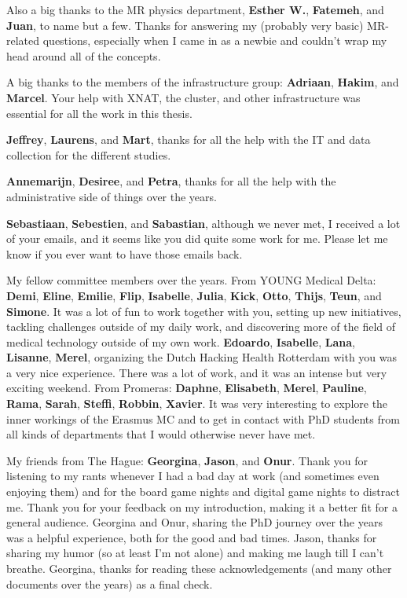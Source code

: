 Also a big thanks to the MR physics department, \textbf{Esther W.}, \textbf{Fatemeh}, and \textbf{Juan}, to name but a few.
Thanks for answering my (probably very basic) MR-related questions, especially when I came in as a newbie and couldn't wrap my head around all of the concepts.

A big thanks to the members of the infrastructure group: \textbf{Adriaan}, \textbf{Hakim}, and \textbf{Marcel}.
Your help with XNAT, the cluster, and other infrastructure was essential for all the work in this thesis.

\textbf{Jeffrey}, \textbf{Laurens}, and \textbf{Mart}, thanks for all the help with the IT and data collection for the different studies.

\textbf{Annemarijn}, \textbf{Desiree}, and \textbf{Petra}, thanks for all the help with the administrative side of things over the years.

\textbf{Sebastiaan}, \textbf{Sebestien}, and \textbf{Sabastian}, although we never met, I received a lot of your emails, and it seems like you did quite some work for me.
Please let me know if you ever want to have those emails back.

My fellow committee members over the years.
From YOUNG Medical Delta: \textbf{Demi}, \textbf{Eline}, \textbf{Emilie}, \textbf{Flip}, \textbf{Isabelle}, \textbf{Julia}, \textbf{Kick}, \textbf{Otto}, \textbf{Thijs}, \textbf{Teun}, and \textbf{Simone}.
It was a lot of fun to work together with you, setting up new initiatives, tackling challenges outside of my daily work, and discovering more of the field of medical technology outside of my own work.
\textbf{Edoardo}, \textbf{Isabelle}, \textbf{Lana}, \textbf{Lisanne}, \textbf{Merel}, organizing the Dutch Hacking Health Rotterdam with you was a very nice experience.
There was a lot of work, and it was an intense but very exciting weekend.
From Promeras: \textbf{Daphne}, \textbf{Elisabeth}, \textbf{Merel}, \textbf{Pauline}, \textbf{Rama}, \textbf{Sarah}, \textbf{Steffi}, \textbf{Robbin}, \textbf{Xavier}.
It was very interesting to explore the inner workings of the Erasmus MC and to get in contact with PhD students from all kinds of departments that I would otherwise never have met.

My friends from The Hague: \textbf{Georgina}, \textbf{Jason}, and \textbf{Onur}.
Thank you for listening to my rants whenever I had a bad day at work (and sometimes even enjoying them) and for the board game nights and digital game nights to distract me.
Thank you for your feedback on my introduction, making it a better fit for a general audience.
Georgina and Onur, sharing the PhD journey over the years was a helpful experience, both for the good and bad times.
Jason, thanks for sharing my humor (so at least I'm not alone) and making me laugh till I can't breathe.
Georgina, thanks for reading these acknowledgements (and many other documents over the years) as a final check.

